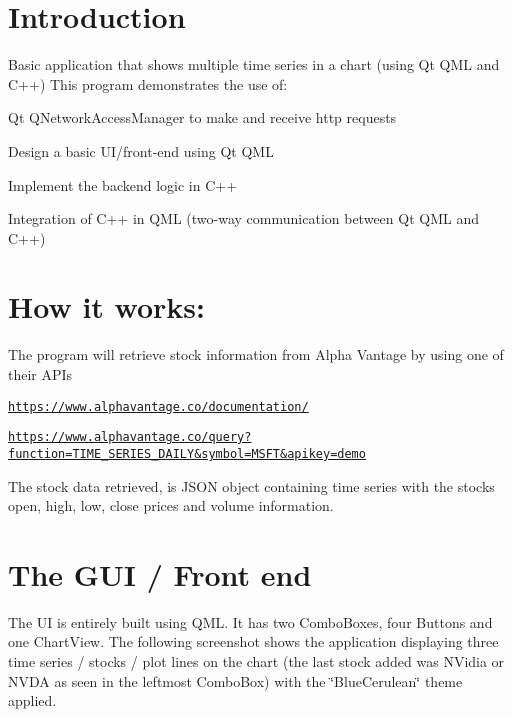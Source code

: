 \hypertarget{index_intro_sec}{}\section{Introduction}\label{index_intro_sec}
Basic application that shows multiple time series in a chart (using Qt Q\+ML and C++) This program demonstrates the use of\+: \begin{DoxyItemize}
\item Qt Q\+Network\+Access\+Manager to make and receive http requests \item Design a basic U\+I/front-\/end using Qt Q\+ML \item Implement the backend logic in C++ \item Integration of C++ in Q\+ML (two-\/way communication between Qt Q\+ML and C++) ~\newline
 ~\newline
 ~\newline
\end{DoxyItemize}
\hypertarget{index_how_sec}{}\section{How it works\+:}\label{index_how_sec}
The program will retrieve stock information from Alpha Vantage by using one of their A\+P\+Is \begin{DoxyItemize}
\item {\ttfamily \href{https://www.alphavantage.co/documentation/}{\tt https\+://www.\+alphavantage.\+co/documentation/}} \item {\ttfamily \href{https://www.alphavantage.co/query?function=TIME_SERIES_DAILY&symbol=MSFT&apikey=demo}{\tt https\+://www.\+alphavantage.\+co/query?function=\+T\+I\+M\+E\+\_\+\+S\+E\+R\+I\+E\+S\+\_\+\+D\+A\+I\+L\+Y\&symbol=\+M\+S\+F\+T\&apikey=demo}} \end{DoxyItemize}
The stock data retrieved, is J\+S\+ON object containing time series with the stock\textquotesingle{}s open, high, low, close prices and volume information. ~\newline
 ~\newline
 ~\newline
\hypertarget{index_gui_sec}{}\section{The G\+U\+I / Front end}\label{index_gui_sec}
The UI is entirely built using Q\+ML. It has two Combo\+Boxes, four Buttons and one Chart\+View. The following screenshot shows the application displaying three time series / stocks / plot lines on the chart (the last stock added was N\+Vidia or N\+V\+DA as seen in the leftmost Combo\+Box) with the \char`\"{}\+Blue\+Cerulean\char`\"{} theme applied. ~\newline
